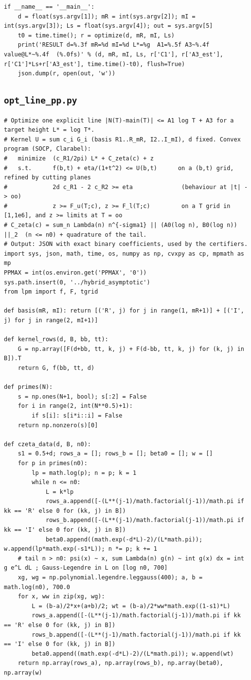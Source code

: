\documentclass[11pt,reqno]{amsart}
\numberwithin{equation}{section}
\theoremstyle{definition}
\theoremstyle{remark}
\begin{document}
\begin{lstlisting}
if __name__ == '__main__':
    d = float(sys.argv[1]); mR = int(sys.argv[2]); mI = int(sys.argv[3]); Ls = float(sys.argv[4]); out = sys.argv[5]
    t0 = time.time(); r = optimize(d, mR, mI, Ls)
    print('RESULT d=%.3f mR=%d mI=%d L*=%g  A1=%.5f A3~%.4f  value@L*~%.4f  (%.0fs)' % (d, mR, mI, Ls, r['C1'], r['A3_est'], r['C1']*Ls+r['A3_est'], time.time()-t0), flush=True)
    json.dump(r, open(out, 'w'))
\end{lstlisting}
\subsection*{\texttt{opt\_line\_pp.py}}
\begin{lstlisting}
# Optimize one explicit line |N(T)-main(T)| <= A1 log T + A3 for a target height L* = log T*.
# Kernel U = sum c_i G_i (basis R1..R_mR, I2..I_mI), d fixed. Convex program (SOCP, Clarabel):
#   minimize  (c_R1/2pi) L* + C_zeta(c) + z
#   s.t.      f(b,t) + eta/(1+t^2) <= U(b,t)      on a (b,t) grid, refined by cutting planes
#             2d c_R1 - 2 c_R2 >= eta              (behaviour at |t| -> oo)
#             z >= F_u(T;c), z >= F_l(T;c)         on a T grid in [1,1e6], and z >= limits at T = oo
# C_zeta(c) = sum_n Lambda(n) n^{-sigma1} || (A0(log n), B0(log n)) ||_2  (n <= n0) + quadrature of the tail.
# Output: JSON with exact binary coefficients, used by the certifiers.
import sys, json, math, time, os, numpy as np, cvxpy as cp, mpmath as mp
PPMAX = int(os.environ.get('PPMAX', '0'))
sys.path.insert(0, '../hybrid_asymptotic')
from lpm import f, F, tgrid

def basis(mR, mI): return [('R', j) for j in range(1, mR+1)] + [('I', j) for j in range(2, mI+1)]

def kernel_rows(d, B, bb, tt):
    G = np.array([F(d+bb, tt, k, j) + F(d-bb, tt, k, j) for (k, j) in B]).T
    return G, f(bb, tt, d)

def primes(N):
    s = np.ones(N+1, bool); s[:2] = False
    for i in range(2, int(N**0.5)+1):
        if s[i]: s[i*i::i] = False
    return np.nonzero(s)[0]

def czeta_data(d, B, n0):
    s1 = 0.5+d; rows_a = []; rows_b = []; beta0 = []; w = []
    for p in primes(n0):
        lp = math.log(p); n = p; k = 1
        while n <= n0:
            L = k*lp
            rows_a.append([-(L**(j-1)/math.factorial(j-1))/math.pi if kk == 'R' else 0 for (kk, j) in B])
            rows_b.append([-(L**(j-1)/math.factorial(j-1))/math.pi if kk == 'I' else 0 for (kk, j) in B])
            beta0.append((math.exp(-d*L)-2)/(L*math.pi)); w.append(lp*math.exp(-s1*L)); n *= p; k += 1
    # tail n > n0: psi(x) ~ x, sum Lambda(n) g(n) ~ int g(x) dx = int g e^L dL ; Gauss-Legendre in L on [log n0, 700]
    xg, wg = np.polynomial.legendre.leggauss(400); a, b = math.log(n0), 700.0
    for x, ww in zip(xg, wg):
        L = (b-a)/2*x+(a+b)/2; wt = (b-a)/2*ww*math.exp((1-s1)*L)
        rows_a.append([-(L**(j-1)/math.factorial(j-1))/math.pi if kk == 'R' else 0 for (kk, j) in B])
        rows_b.append([-(L**(j-1)/math.factorial(j-1))/math.pi if kk == 'I' else 0 for (kk, j) in B])
        beta0.append((math.exp(-d*L)-2)/(L*math.pi)); w.append(wt)
    return np.array(rows_a), np.array(rows_b), np.array(beta0), np.array(w)



\end{lstlisting}
\end{document}
